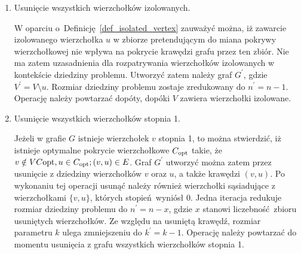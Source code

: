 \begin{enumerate}
  \item Usunięcie wszystkich wierzchołków izolowanych.


    W oparciu o~Definicję~\ref{def_isolated_vertex} zauważyć można, iż zawarcie
    izolowanego wierzchołka $u$ w zbiorze pretendującym do miana pokrywy
    wierzchołkowej nie wpływa na pokrycie krawędzi grafu przez ten zbiór.
    Nie ma zatem uzasadnienia dla rozpatrywania wierzchołków izolowanych w
    kontekście dziedziny problemu.
    Utworzyć zatem należy graf $G^\prime$, gdzie $V^\prime = V
    \setminus u$.
    Rozmiar dziedziny problemu zostaje zredukowany do $n^\prime=n-1$.
    Operację należy powtarzać dopóty, dopóki $V$ zawiera wierzchołki izolowane.

  \item Usunięcie wszystkich wierzchołków stopnia 1.


    Jeżeli w grafie $G$ istnieje wierzchołek $v$ stopnia 1, to można 
    stwierdzić, iż istnieje optymalne pokrycie wierzchołkowe $C_{\textnormal{opt}}$ takie, że
    $v \notin VC{\textnormal{opt}}, u \in C_{\textnormal{opt}}; (v,u) \in E$.
    Graf $G^\prime$ utworzyć można zatem przez usunięcie z dziedziny wierzchołków $v$ oraz
    $u$, a także krawędzi $(v,u)$.
    Po wykonaniu tej operacji usunąć należy również wierzchołki sąsiadujące z wierzchołkami
    $\{v,u\}$, których stopień~wyniósł 0.
    Jedna iteracja redukuje rozmiar dziedziny problemu do $n^\prime=n-x$, gdzie
    $x$ stanowi liczebność~zbioru usuniętych wierzchołków.
    Ze względu na usuniętą krawędź, rozmiar parametru $k$ ulega zmniejszeniu do
    $k^\prime=k-1$.
    Operację należy powtarzać do momentu usunięcia z grafu wszystkich
    wierzchołków stopnia 1.


\end{enumerate}
